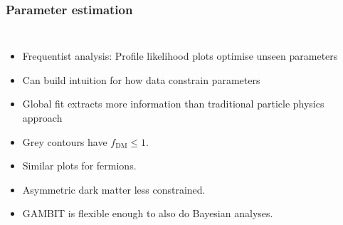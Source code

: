 \documentclass[aspectratio=169]{beamer}
\begin{document}
\begin{frame}
    \frametitle{Parameter estimation}
    \begin{columns}
        \begin{itemize}
            \item Frequentist analysis: Profile likelihood plots optimise unseen parameters 
            \item Can build intuition for how data constrain parameters
            \item Global fit extracts more information than traditional particle physics approach
            \item Grey contours have $f_\text{DM}\le1$.
            \item Similar plots for fermions.
            \item Asymmetric dark matter less constrained.
            \item GAMBIT is flexible enough to also do Bayesian analyses.
        \end{itemize}
        

\end{columns}
\end{frame}
\end{document}
